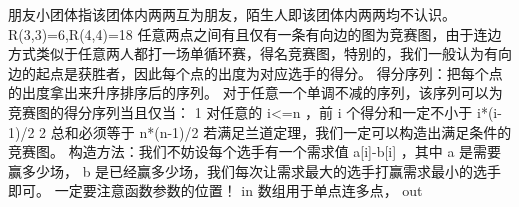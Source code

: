 {}朋友小团体指该团体内两两互为朋友，陌生人即该团体内两两均不认识。\markdownRendererParagraphSeparator
{}\markdownRendererDollarSign{} R(3,3)=6,R(4,4)=18 \markdownRendererDollarSign{}\markdownRendererInterblockSeparator
{}
\markdownRendererSectionEnd \markdownRendererSectionBegin
{}\markdownRendererInterblockSeparator
{}任意两点之间有且仅有一条有向边的图为竞赛图，由于连边方式类似于任意两人都打一场单循环赛，得名竞赛图，特别的，我们一般认为有向边的起点是获胜者，因此每个点的出度为对应选手的得分。\markdownRendererParagraphSeparator
{}得分序列：把每个点的出度拿出来升序排序后的序列。\markdownRendererParagraphSeparator
{}\markdownRendererSectionBegin
\markdownRendererSectionBegin
{}\markdownRendererInterblockSeparator
{}对于任意一个单调不减的序列，该序列可以为竞赛图的得分序列当且仅当：\markdownRendererParagraphSeparator
{}\markdownRendererDollarSign{} 1 \markdownRendererDollarSign{}对任意的\markdownRendererDollarSign{} i<=n \markdownRendererDollarSign{}，前\markdownRendererDollarSign{} i \markdownRendererDollarSign{}个得分和一定不小于\markdownRendererDollarSign{} i*(i-1)/2 \markdownRendererDollarSign{}\markdownRendererParagraphSeparator
{}\markdownRendererDollarSign{} 2 \markdownRendererDollarSign{}总和必须等于\markdownRendererDollarSign{} n*(n-1)/2 \markdownRendererDollarSign{}\markdownRendererParagraphSeparator
{}若满足兰道定理，我们一定可以构造出满足条件的竞赛图。\markdownRendererParagraphSeparator
{}构造方法：我们不妨设每个选手有一个需求值\markdownRendererDollarSign{} a[i]-b[i] \markdownRendererDollarSign{}，其中\markdownRendererDollarSign{} a \markdownRendererDollarSign{}是需要赢多少场，\markdownRendererDollarSign{} b \markdownRendererDollarSign{}是已经赢多少场，我们每次让需求最大的选手打赢需求最小的选手即可。\markdownRendererInterblockSeparator
{}
\markdownRendererSectionEnd 
\markdownRendererSectionEnd 
\markdownRendererSectionEnd \markdownRendererSectionBegin
{}\markdownRendererInterblockSeparator
{}\markdownRendererSectionBegin
{}\markdownRendererInterblockSeparator
{}一定要注意函数参数的位置！\markdownRendererParagraphSeparator
{}\markdownRendererDollarSign{} in \markdownRendererDollarSign{}数组用于单点连多点，\markdownRendererDollarSign{} out\markdownRendererSoftLineBreak
